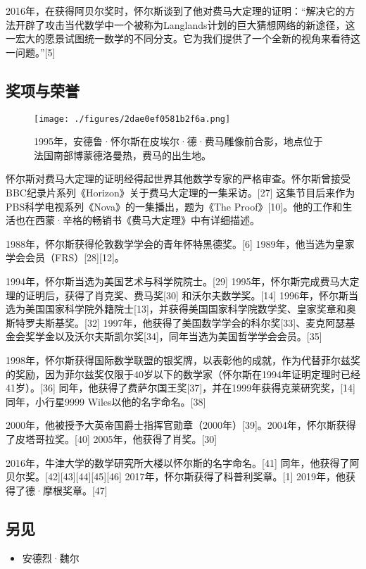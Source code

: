 2016年，在获得阿贝尔奖时，怀尔斯谈到了他对费马大定理的证明：“解决它的方法开辟了攻击当代数学中一个被称为Langlands计划的巨大猜想网络的新途径，这一宏大的愿景试图统一数学的不同分支。它为我们提供了一个全新的视角来看待这一问题。”[5]
\subsection{奖项与荣誉}
\begin{figure}[ht]
\centering
\texttt{[image: ./figures/2dae0ef0581b2f6a.png]}
\caption{1995年，安德鲁·怀尔斯在皮埃尔·德·费马雕像前合影，地点位于法国南部博蒙德洛曼热，费马的出生地。} \label{fig_Andrew_2}
\end{figure}
怀尔斯对费马大定理的证明经得起世界其他数学专家的严格审查。怀尔斯曾接受BBC纪录片系列《Horizon》关于费马大定理的一集采访。[27] 这集节目后来作为PBS科学电视系列《Nova》的一集播出，题为《The Proof》[10]。他的工作和生活也在西蒙·辛格的畅销书《费马大定理》中有详细描述。

1988年，怀尔斯获得伦敦数学学会的青年怀特黑德奖。[6] 1989年，他当选为皇家学会会员（FRS）[28][12]。

1994年，怀尔斯当选为美国艺术与科学院院士。[29] 1995年，怀尔斯完成费马大定理的证明后，获得了肖克奖、费马奖[30] 和沃尔夫数学奖。[14] 1996年，怀尔斯当选为美国国家科学院外籍院士[13]，并获得美国国家科学院数学奖、皇家奖章和奥斯特罗夫斯基奖。[32] 1997年，他获得了美国数学学会的科尔奖[33]、麦克阿瑟基金会奖学金以及沃尔夫斯凯尔奖[34]，同年当选为美国哲学学会会员。[35]

1998年，怀尔斯获得国际数学联盟的银奖牌，以表彰他的成就，作为代替菲尔兹奖的奖励，因为菲尔兹奖仅限于40岁以下的数学家（怀尔斯在1994年证明定理时已经41岁）。[36] 同年，他获得了费萨尔国王奖[37]，并在1999年获得克莱研究奖，[14] 同年，小行星9999 Wiles以他的名字命名。[38]

2000年，他被授予大英帝国爵士指挥官勋章（2000年）[39]。2004年，怀尔斯获得了皮塔哥拉奖。[40] 2005年，他获得了肖奖。[30]

2016年，牛津大学的数学研究所大楼以怀尔斯的名字命名。[41] 同年，他获得了阿贝尔奖。[42][43][44][45][46] 2017年，怀尔斯获得了科普利奖章。[1] 2019年，他获得了德·摩根奖章。[47]
\subsection{另见}  
\begin{itemize}
\item 安德烈·魏尔
\end{itemize}
